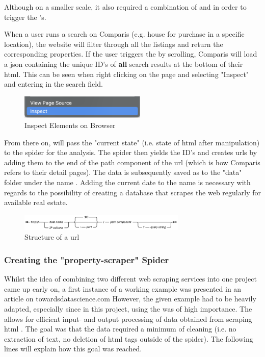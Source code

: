 \documentclass[main]{subfiles}
\begin{document}
Although on a smaller scale, 
it also required a combination of \pkg[Scrapy] and \pkg[Selenium] in order to trigger the \js's.

When a user runs a search on Comparis (e.g. house for purchase in a specific location), 
the website will filter through all the listings and return the corresponding properties.
If the user triggers the \js by scrolling, Comparis will load a \acs*{json} 
containing the unique ID's of \textbf{all} search results at the bottom of their \acs*{html}.
This can be seen when right clicking on the page and selecting "Inspect" and entering  
in the search field.

\begin{figure}[htbp]
    \centerline{
        \includegraphics[width = 60mm]{prog_3.png}}
    \caption{Inspect Elements on Browser}
    \label{fig:inspectelement}
\end{figure}

From there on, \pkg[Selenium] will pass the "current state" (i.e. state of \acs*{html} after \js manipulation)
to the spider for the analysis.
The spider then yields the ID's and creates \acsp*{url} by adding them to the end of the path component of the \acs*{url}
(which is how Comparis refers to their detail pages).
The data is subsequently saved as \pkg[.csv] to the "data" folder under the name .
Adding the current date to the name is necessary with regards to the possibility 
of creating a database that scrapes the web regularly for available real estate.

\begin{figure}[htbp]
    \centerline{
        \includegraphics[width = 80mm]{prog_4.png}}
    \caption{Structure of a \acs*{url} \cite{IBMDocumentation2021}}
    \label{fig:htmlstructure}
\end{figure}

\vspace*{5pt}
\subsubsection{Creating the "property-scraper" Spider}
Whilst the idea of combining two different web scraping services into one project came up early on,
a first instance of a working example was presented in an article on towardsdatascience.com\cite{reusovaWebScrapingLess2019}
However, the given example had to be heavily adapted, especially since in this project, 
using the \pkg[ItemLoader] was of high importance.
The \pkg[ItemLoader] allows for efficient input- and output processing of data obtained from scraping \acs*{html} \cite{ScrapyTutorialScrapy}. 
The goal was that the data required a minimum of cleaning (i.e. no extraction of text, no deletion of \acs*{html} tags outside of the spider).
The following lines will explain how this goal was reached.
\end{document}
